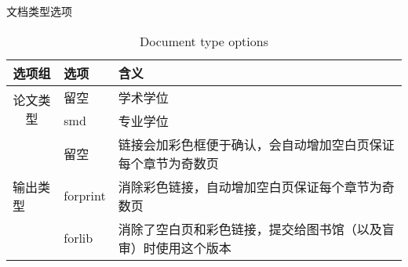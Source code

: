 \documentclass[smd,entitle,forlib,AutoFakeBold]{NJTECHMaster}
\begin{document}
\begin{table}[h]
	\centering
	\caption{文档类型选项}
	\addtocounter{table}{-1}
	\renewcommand{\tablename}{Table}
	\caption{Document type options}
	\renewcommand{\tablename}{表}
	\label{tbl-DTO}
	\vspace{2pt}
	\small
	\begin{tabular}{l|l|l}
		\hline
		\multicolumn{1}{c|}{选项组}                   & 选项           & 含义                                                                                                                                                                                                                                                                                      \\ \hline
		\multicolumn{1}{c|}{\multirow{2}{*}{论文类型}} & 留空           & 学术学位                                                                                                                                                                                                                                                                                    \\ \cline{2-3} 
		\multicolumn{1}{c|}{}                      & smd          & 专业学位                                                                                                                                                                                                                                                                                    \\ \hline
		\multirow{3}{*}{输出类型}                       & 留空           & 链接会加彩色框便于确认，会自动增加空白页保证每个章节为奇数页                                                                                                                                                                                                                                                          \\ \cline{2-3} 
		& forprint     & 消除彩色链接，自动增加空白页保证每个章节为奇数页                                                                                                                                                                                                                                                    \\ \cline{2-3} 
		& forlib     & 消除了空白页和彩色链接，提交给图书馆（以及盲审）时使用这个版本                                                                                                                                                                                                                                                         \\ \hline

\end{tabular}
\end{table}
\end{document}
